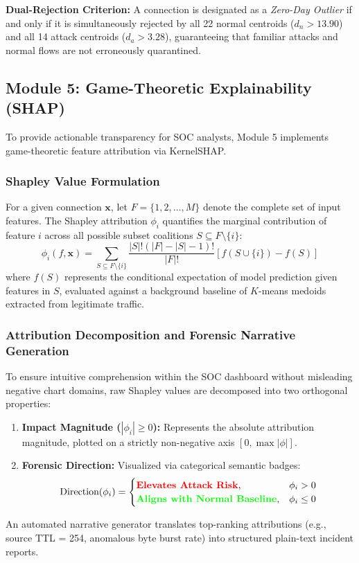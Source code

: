 \documentclass[preprint,12pt]{elsarticle}
\begin{document}
\textbf{Dual-Rejection Criterion:} A connection is designated as a \textit{Zero-Day Outlier} if and only if it is simultaneously rejected by all 22 normal centroids ($d_n > 13.90$) and all 14 attack centroids ($d_a > 3.28$), guaranteeing that familiar attacks and normal flows are not erroneously quarantined.

\subsection{Module 5: Game-Theoretic Explainability (SHAP)}
To provide actionable transparency for SOC analysts, Module 5 implements game-theoretic feature attribution via KernelSHAP.

\subsubsection{Shapley Value Formulation}
For a given connection $\mathbf{x}$, let $F = \{1, 2, \dots, M\}$ denote the complete set of input features. The Shapley attribution $\phi_i$ quantifies the marginal contribution of feature $i$ across all possible subset coalitions $S \subseteq F \setminus \{i\}$:
\begin{equation}
    \phi_i(f, \mathbf{x}) = \sum_{S \subseteq F \setminus \{i\}} \frac{|S|! (|F| - |S| - 1)!}{|F|!} \left[ f(S \cup \{i\}) - f(S) \right]
\end{equation}
where $f(S)$ represents the conditional expectation of model prediction given features in $S$, evaluated against a background baseline of $K$-means medoids extracted from legitimate traffic.

\subsubsection{Attribution Decomposition and Forensic Narrative Generation}
To ensure intuitive comprehension within the SOC dashboard without misleading negative chart domains, raw Shapley values are decomposed into two orthogonal properties:
\begin{enumerate}
    \item \textbf{Impact Magnitude ($|\phi_i| \ge 0$):} Represents the absolute attribution magnitude, plotted on a strictly non-negative axis $[0, \max |\phi|]$.
    \item \textbf{Forensic Direction:} Visualized via categorical semantic badges:
    \begin{equation}
        \text{Direction}(\phi_i) = \begin{cases}
            \text{\textcolor{red}{\textbf{Elevates Attack Risk}}}, & \phi_i > 0 \\
            \text{\textcolor{green}{\textbf{Aligns with Normal Baseline}}}, & \phi_i \le 0
        \end{cases}
    \end{equation}
\end{enumerate}
An automated narrative generator translates top-ranking attributions (e.g., source TTL = 254, anomalous byte burst rate) into structured plain-text incident reports.
\end{document}
